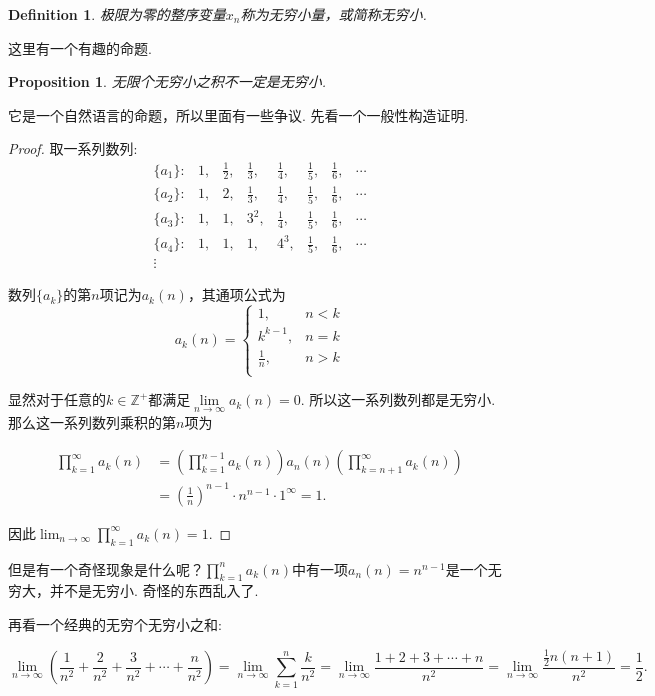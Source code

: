 \documentclass{article}
\newtheorem{proposition}[theorem]{Proposition}
\newtheorem{definition}[theorem]{Definition}
\begin{document}
\begin{definition}
极限为零的整序变量$x_n$称为无穷小量，或简称无穷小.
\end{definition}

这里有一个有趣的命题.

\begin{proposition}
无限个无穷小之积不一定是无穷小.
\end{proposition}

它是一个自然语言的命题，所以里面有一些争议. 先看一个一般性构造证明.

\begin{proof}
取一系列数列: \\

$$
\begin{matrix} 
\{a_1\}:&1,&\frac12, & \frac13, &\frac14, & \frac15, & \frac16, &\cdots\\ \{a_2\}:&1,&2,&\frac13, &\frac14, &\frac15, &\frac16, &\cdots\\ \{a_3\}:&1,&1,&3^2, &\frac14, &\frac15, &\frac16, &\cdots\\ \{a_4\}:&1,&1,&1,&4^3,&\frac15, &\frac16, &\cdots\\ \vdots
\end{matrix}
$$

数列$\{a_k\}$的第$n$项记为$a_k(n)$，其通项公式为
$$
a_k(n)=\begin{cases} 1,&n<k\\ k^{k-1},&n=k\\ \frac1n,&n>k\\ \end{cases}
$$

显然对于任意的$k \in \mathbb{Z}^+$都满足$\lim\limits_{n\to\infty}a_k(n)=0$. 所以这一系列数列都是无穷小. 那么这一系列数列乘积的第$n$项为

\begin{align*}
\prod_{k=1}^\infty a_k(n) &=\left(\prod_{k=1}^{n-1}a_k(n)\right) a_n(n)\left(\prod_{k=n+1}^\infty a_k(n)\right) \\
&=\left(\frac1n\right)^{n-1}\cdot n^{n-1}\cdot1^\infty=1.
\end{align*}

因此$\lim_{n\to\infty}\prod_{k=1}^\infty a_k(n)=1$.
\end{proof}

但是有一个奇怪现象是什么呢？$\prod_{k=1}^na_k(n)$中有一项$a_n(n)=n^{n-1}$是一个无穷大，并不是无穷小. 奇怪的东西乱入了.

再看一个经典的无穷个无穷小之和:

$$
\lim_{n\to\infty}\left(\frac1{n^2}+\frac2{n^2}+\frac3{n^2}+\cdots+\frac n{n^2}\right)=\lim_{n\to\infty}\sum_{k=1}^n\frac k{n^2} = \lim_{n\to\infty}\frac{1+2+3+\cdots+n}{n^2}=\lim_{n\to\infty}\frac{\frac12n(n+1)}{n^2}=\frac12.
$$
\end{document}
